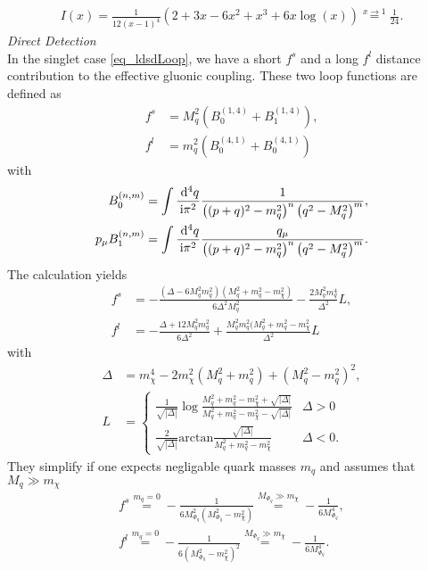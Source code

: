 \begin{appendix}
\begin{align}
 I(x) = \frac{1}{12(x-1)^4}\left(2+3x-6x^2+x^3+6x\log(x) \right) \stackrel{x\rightarrow1}{=} \frac{1}{24}.
 \label{eq_loopmuon}
\end{align}
\textit{Direct Detection}\\
\noindent In the singlet case \eqref{eq_ldsdLoop}, we have a short $f^s$ and a long $f^l$ distance contribution to the effective gluonic coupling. These two loop functions
are defined as \cite{1007.2601}
\begin{align}
 f^s &= M_q^2(B_0^{(1,4)} + B_1^{(1,4)}),\\
 f^l &= m_q^2(B_0^{(4,1)} + B_0^{(4,1)})
 \label{eq_singletloop}
\end{align}
with
\begin{align}
 B_0^{(n,m)} &= \int \frac{\; \mathrm{d}^4 q}{\text{i} \pi^2}\frac{1}{\left((p+q)^2-m_q^2\right)^n\left(q^2-M^2_q\right)^m},\\
 p_\mu B_1^{(n,m)} &= \int \frac{\; \mathrm{d}^4 q}{\text{i} \pi^2}\frac{q_\mu}{\left((p+q)^2-m_q^2\right)^n\left(q^2-M^2_q\right)^m}.
\end{align}
The calculation yields
\begin{align}
 f^s &=-\frac{(\Delta-6M_q^2m_q^2)(M_q^2+m_q^2-m_\chi^2)}{6\Delta^2M_q^2} - \frac{2M_q^2m_q^4}{\Delta^2}L,\\
 f^l &=-\frac{\Delta+12M_q^2m_q^2}{6\Delta^2} + \frac{M_q^2m_q^2(M_q^2+m_q^2-m_\chi^2}{\Delta^2}L
\end{align}
with
\begin{align}
 \Delta &= m_\chi^4-2m_\chi^2(M_q^2+m_q^2) + (M_q^2-m_q^2)^2,\\
 L&= \begin{cases} \frac{1}{\sqrt{|\Delta|}}\log\frac{M_q^2+m_q^2-m_\chi^2+\sqrt{|\Delta|}}{M_q^2+m_q^2-m_\chi^2-\sqrt{|\Delta|}} & \Delta>0\\ 
		  \frac{2}{\sqrt{|\Delta|}}\text{arctan}\frac{\sqrt{|\Delta|}}{M_q^2+m_q^2-m_\chi^2} &\Delta<0.   
     \end{cases}
\end{align}
They simplify if one expects negligable quark masses $m_q$ and assumes that $M_q \gg m_\chi$
\begin{align}
 f^s \stackrel{m_q=0}{=} - \frac{1}{6M_{\Phi_q}^2\left(M_{\Phi_q}^2-m_\chi^2\right)} \stackrel{M_{\Phi_q}\gg m_\chi}{=} -\frac{1}{6M_{\Phi_q}^4},\\
 f^l \stackrel{m_q=0}{=} - \frac{1}{6\left(M_{\Phi_q}^2-m_\chi^2\right)^2}  \stackrel{M_{\Phi_q}\gg m_\chi}{=} -\frac{1}{6M_{\Phi_q}^4}.
\end{align}


\end{appendix}
